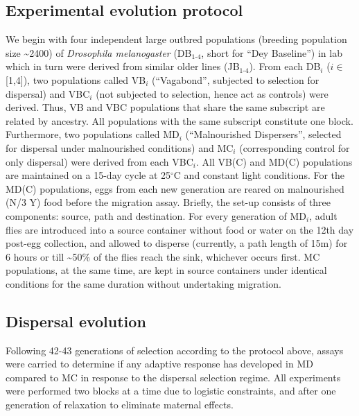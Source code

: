 \documentclass[12pt,onecolumn,twoside]{article}
\begin{document}
	\subsection{Experimental evolution protocol}
	We begin with four independent large outbred populations (breeding population size \textasciitilde 2400) of \textit{Drosophila melanogaster} (DB$_{\text{1-4}}$, short for “Dey Baseline”) in lab which in turn were derived from similar older lines (JB$_{\text{1-4}}$). From each DB$_{i}$ ($i\in$ [1,4]), two populations called VB$_{i}$ (“Vagabond”, subjected to selection for dispersal) and VBC$_{i}$ (not subjected to selection, hence act as controls) were derived. Thus, VB and VBC populations that share the same subscript are related by ancestry. All populations with the same subscript constitute one block. Furthermore, two populations called MD$_{i}$ (“Malnourished Dispersers”, selected for dispersal under malnourished conditions) and MC$_{i}$ (corresponding control for only dispersal) were derived from each VBC$_{i}$. All VB(C) and MD(C) populations are maintained on a 15-day cycle at 25$^{\circ}$C and constant light conditions. For the MD(C) populations, eggs from each new generation are reared on malnourished (N/3 Y) food before the migration assay. Briefly, the set-up consists of three components: source, path and destination. For every generation of MD$_{i}$, adult flies are introduced into a source container without food or water on the 12th day post-egg collection, and allowed to disperse (currently, a path length of 15m) for 6 hours or till \textasciitilde 50\% of the flies reach the sink, whichever occurs first. MC populations, at the same time, are kept in source containers under identical conditions for the same duration without undertaking migration.
	\subsection{Dispersal evolution}
	Following 42-43 generations of selection according to the protocol above, assays were carried to determine if any adaptive response has developed in MD compared to MC in response to the dispersal selection regime. All experiments were performed two blocks at a time due to logistic constraints, and after one generation of relaxation to eliminate maternal effects.
\end{document}
